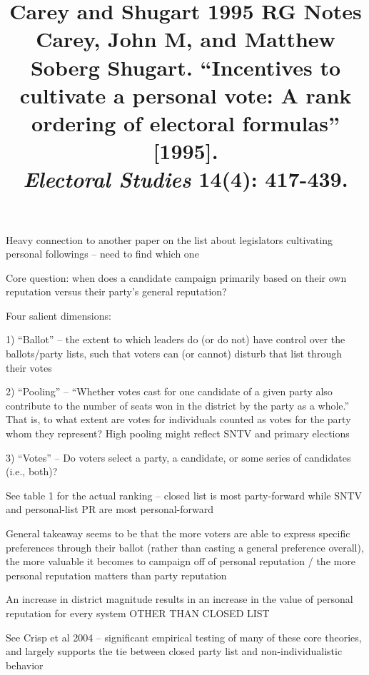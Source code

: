 \documentclass[12pt]{article}
\title{\textbf{Carey and Shugart 1995 RG Notes}\\
\large Carey, John M, and Matthew Soberg Shugart. ``Incentives to cultivate a personal vote: A rank ordering of electoral formulas'' [1995].\\
\textit{Electoral Studies} 14(4): 417-439.}
\author{}
\date{}
\begin{document}
\maketitle

Heavy connection to another paper on the list about legislators cultivating personal followings -- need to find which one

Core question: when does a candidate campaign primarily based on their own reputation versus their party's general reputation?

Four salient dimensions:

1) ``Ballot'' -- the extent to which leaders do (or do not) have control over the ballots/party lists, such that voters can (or cannot) disturb that list through their votes

2) ``Pooling'' -- ``Whether votes cast for one candidate of a given party also contribute to the number of seats won in the district by the party as a whole.'' That is, to what extent are votes for individuals counted as votes for the party whom they represent? High pooling might reflect SNTV and primary elections

3) ``Votes'' -- Do voters select a party, a candidate, or some series of candidates (i.e., both)?

See table 1 for the actual ranking -- closed list is most party-forward while SNTV and personal-list PR are most personal-forward

General takeaway seems to be that the more voters are able to express specific preferences through their ballot (rather than casting a general preference overall), the more valuable it becomes to campaign off of personal reputation / the more personal reputation matters than party reputation

An increase in district magnitude results in an increase in the value of personal reputation for every system OTHER THAN CLOSED LIST

See Crisp et al 2004 -- significant empirical testing of many of these core theories, and largely supports the tie between closed party list and non-individualistic behavior
\end{document}
